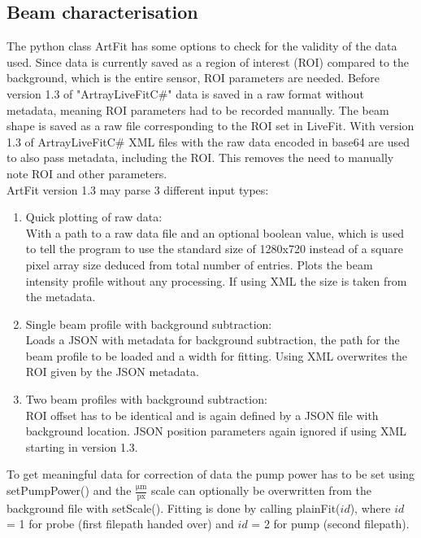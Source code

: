 \documentclass[twoside,openright,listof=numbered]{scrreprt}
\begin{document}
\subsection{Beam characterisation}\label{sec:pythonBeamCharacterisation}


The python class ArtFit has some options to check for the validity of the data used. Since data is currently saved as a region of interest (ROI) compared to the background, which is the entire sensor, ROI parameters are needed. Before version 1.3 of "ArtrayLiveFitC\#" data is saved in a raw format without metadata, meaning ROI parameters had to be recorded manually.  The beam shape is saved as a raw file corresponding to the ROI set in LiveFit. With version 1.3 of ArtrayLiveFitC\# XML files with the raw data encoded in base64 are used to also pass metadata, including the ROI. This removes the need to manually note ROI and other parameters.\\
ArtFit version 1.3 may parse 3 different input types:
\begin{enumerate}
\item Quick plotting of raw data:\\
With a path to a raw data file and an optional boolean value, which is used to tell the program to use the standard size of 1280x720 instead of a square pixel array size deduced from total number of entries. Plots the beam intensity profile without any processing. If using XML the size is taken from the metadata.
\item Single beam profile with background subtraction: \\
Loads a JSON with metadata for background subtraction, the path for the beam profile to be loaded and a width for fitting. Using XML overwrites the ROI given by the JSON metadata.
\item Two beam profiles with background subtraction: \\
ROI offset has to be identical and is again defined by a JSON file with background location. JSON position parameters again ignored if using XML starting in version 1.3.
\end{enumerate}

To get meaningful data for correction of data the pump power has to be set using setPumpPower() and the $\mathrm{\frac{\si{\micro\meter}}{px}}$ scale can optionally be overwritten from the background file with setScale(). Fitting is done by calling plainFit($id$), where $id$ = 1 for probe (first filepath handed over) and $id$ = 2 for pump (second filepath).
\end{document}
